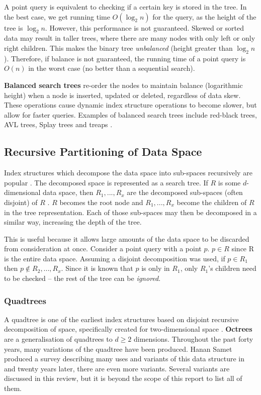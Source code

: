 A point query is equivalent to checking if a certain key is stored in the tree. In the best case, we get running time $O(\log_2 n)$ for the query, as the height of the tree is $\log_2 n$. However, this performance is not guaranteed. Skewed or sorted data may result in taller trees, where there are many nodes with only left or only right children. This makes the binary tree \textit{unbalanced} (height greater than $\log_2 n$). Therefore, if balance is not guaranteed, the running time of a point query is $O(n)$ in the worst case (no better than a sequential search).

\textbf{Balanced search trees} re-order the nodes to maintain balance (logarithmic height) when a node is inserted, updated or deleted, regardless of data skew. These operations cause dynamic index structure operations to become slower, but allow for faster queries. Examples of balanced search trees include red-black trees, AVL trees, Splay trees and treaps \cite{introduction-to-algorithms}.

\subsection{Recursive Partitioning of Data Space}
\label{sec:recursive-partition-structures}

Index structures which decompose the data space into sub-spaces recursively are popular \cite{md-structures-samet}. The decomposed space is represented as a search tree. If $R$ is some $d$-dimensional data space, then $R_1,...,R_x$ are the decomposed sub-spaces (often disjoint) of $R$ . $R$ becomes the root node and $R_1,...,R_x$ become the children of $R$ in the tree representation. Each of those sub-spaces may then be decomposed in a similar way, increasing the depth of the tree.

This is useful because it allows large amounts of the data space to be discarded from consideration at once. Consider a point query with a point $p$. $p \in R$ since R is the entire data space. Assuming a disjoint decomposition was used, if $p \in R_1$ then $p \not\in R_2,...,R_x$. Since it is known that $p$ is only in $R_1$, only $R_1$'s children need to be checked -- the rest of the tree can be \textit{ignored}.

\subsubsection{Quadtrees}

A quadtree is one of the earliest index structures based on disjoint recursive decomposition of space, specifically created for two-dimensional space \cite{original-quadtree}. \textbf{Octrees} are a generalisation of quadtrees to $d \geq 2$ dimensions. Throughout the past forty years, many variations of the quadtree have been produced. Hanan Samet produced a survey describing many uses and variants of this data structure in  \cite{quadtree} and twenty years later, there are even more variants. Several variants are discussed in this review, but it is beyond the scope of this report to list all of them.

